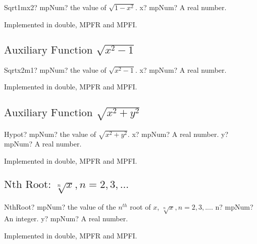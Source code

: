 \begin{mpFunctionsExtract}
	\mpFunctionOne
	{Sqrt1mx2? mpNum? the value of $\sqrt{1-x^2}$.}
	{x? mpNum? A real number.}
\end{mpFunctionsExtract}

Implemented in double, MPFR and MPFI.



\subsection{\texorpdfstring{$\text{Auxiliary Function }\sqrt{x^2-1}$}{sqrtx2m1}}

\begin{mpFunctionsExtract}
	\mpFunctionOne
	{Sqrtx2m1? mpNum? the value of $\sqrt{x^2-1}$.}
	{x? mpNum? A real number.}
\end{mpFunctionsExtract}

Implemented in double, MPFR and MPFI.



\subsection{\texorpdfstring{$\text{Auxiliary Function }\sqrt{x^2+y^2}$}{Hypot}}

\begin{mpFunctionsExtract}
	\mpFunctionTwo
	{Hypot? mpNum? the value of $\sqrt{x^2+y^2}$.}
	{x? mpNum? A real number.}
	{y? mpNum? A real number.}
\end{mpFunctionsExtract}

Implemented in double, MPFR and MPFI.



\subsection{\texorpdfstring{$\text{Nth Root: }\sqrt[n]{x}, n=2,3,...$}{nthRoot}}

\begin{mpFunctionsExtract}
	\mpFunctionTwo
	{NthRoot? mpNum? the value of the $n^{th}$ root of $x$, $\sqrt[n]{x}, n=2,3,...$.}
	{n? mpNum? An integer.}
	{y? mpNum? A real number.}
\end{mpFunctionsExtract}

Implemented in double, MPFR and MPFI.







